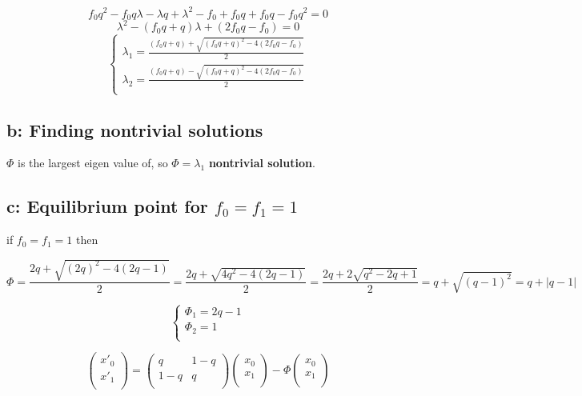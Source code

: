 \[ f_0q^2 - f_0q\lambda -\lambda q+\lambda^2 - f_0 + f_0q + f_0q - f_0q^2 = 0 \]
\[ \lambda^2 - (f_0q+q)\lambda + (2f_0q-f_0) = 0 \]
\[ \left\{ \begin{array}{l}
         \lambda_1 = \frac{(f_0q+q) + \sqrt{(f_0q+q)^2 - 4(2f_0q-f_0)}}{2}\\
         \lambda_2 = \frac{(f_0q+q) - \sqrt{(f_0q+q)^2 - 4(2f_0q-f_0)}}{2}\\
       \end{array} \right. \] 

\subsection{b: Finding nontrivial solutions}

$\varPhi$ is the largest eigen value of, so $\varPhi = \lambda_1$ \textbf{nontrivial solution}.

\subsection{c: Equilibrium point for $f_0 = f_1 = 1$}

if  $f_0 = f_1 = 1$ then

\[\varPhi = \frac{2q + \sqrt{(2q)^2 - 4(2q-1)}}{2} = \frac{2q+\sqrt{4q^2 - 4(2q-1)}}{2} = \frac{2q+2\sqrt{q^2-2q+1}}{2} = q + \sqrt{(q-1)^2} = q + |q-1| \]

\[ \left\{ \begin{array}{l}
         \varPhi_1 = 2q-1\\
         \varPhi_2 =1\\
       \end{array} \right. \] 

\[ \begin{pmatrix}
         x'_0\\
         x'_1\\
       \end{pmatrix}  = 
       \begin{pmatrix}
                q & 1-q\\
                1-q & q\\
              \end{pmatrix}
              \begin{pmatrix}
                             x_0\\
                              x_1\\
                            \end{pmatrix} - \varPhi \begin{pmatrix}
                                            x_0\\
                                            x_1\\
                                          \end{pmatrix} \] 

